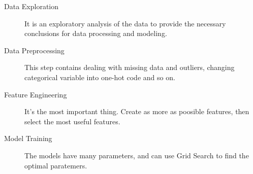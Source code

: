 \documentclass{tikzposter} %
\begin{document}
\begin{columns}
{}


{
	\begin{description}
		\item[Data Exploration] It is an 
		exploratory analysis of the data to 
		provide the necessary conclusions 
		for data processing and modeling.
		\item[Data Preprocessing] This step contains
		dealing with missing data and outliers,
		changing categorical variable 
		into one-hot code and so on.
		\item[Feature Engineering] It's the 
		most important thing.
		Create as more as poosible features,
		then select the most useful features.
		\item[Model Training] The models have 
		many parameters,
		and can use Grid Search to find 
		the optimal paratemers.	
	\end{description}
}





\end{columns}


\end{document}
